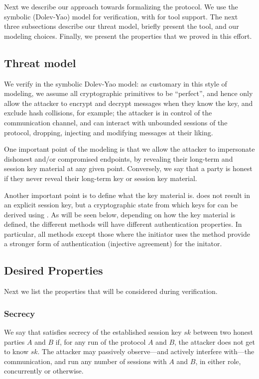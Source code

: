 \fillhack
Next we describe our approach towards formalizing the \mEdhoc{} protocol. We use the
symbolic (Dolev-Yao) model for verification, with \mTamarin{} for tool support.
%
The next three subsections describe our threat model, briefly present the
\mTamarin{} tool, and our modeling choices.
%
Finally, we present the properties that we proved in this effort.

\spacehack
\subsection{Threat model}\label{sec:threat-model}
\fillhack
We verify \mEdhoc{} in the symbolic Dolev-Yao model: as customary in this style of
modeling, we assume all cryptographic primitives to be ``perfect'', and hence
only allow the attacker to encrypt and decrypt messages when they know the key,
and exclude hash collisions, for example; the attacker is in control of the
communication channel, and can interact with unbounded sessions of the protocol,
dropping, injecting and modifying messages at their liking.

One important point of the modeling is that we allow the attacker to impersonate
dishonest and/or compromised endpoints, by revealing their long-term and session
key material at any given point.
%
Conversely, we say that a party is honest if they never reveal their
long-term key or session key material.

Another important point is to define what the key material is.
    \mEdhoc{} does not result in an explicit session key, but a cryptographic
    state from which keys for \mOscore{} can be derived using \mHkdf.
    As will be seen below, depending on how the key material is defined, the
    different methods will have different authentication properties.
    In particular, all methods except those where the initiator uses the
    \mStat{} method provide a stronger form of authentication (injective
    agreement) for the initator.

\spacehack
\subsection{Desired Properties}
\label{sec:desired-properties}
\fillhack
Next we list the properties that will be considered during verification.

\spacehack
\subsubsection{Secrecy}
We say that \mEdhoc{} satisfies secrecy of the established session key $sk$
between two honest parties $A$ and $B$ if, for any run of the protocol $A$ and
$B$, the attacker does not get to know $sk$.
%
The attacker may passively observe---and actively interfere with---the
communication, and run any number of sessions with $A$ and $B$, in either role,
concurrently or otherwise.

